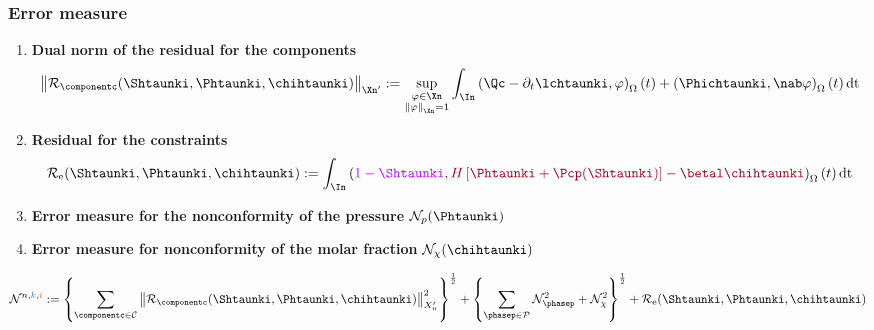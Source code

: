\begin{frame}
\frametitle{Error measure}
\vspace{-0.3 cm}
\begin{enumerate}
\item<1> 
\textcolor{cadmiumgreen}{\textbf{Dual norm of the residual for the components}}
 \begin{equation*}
\left\|\mathcal{R}_{\componentc}(\Shtaunki,\Phtaunki,\chihtaunki) \right\|_{\Xn'} \egaldef \sup_{\substack{\varphi \in \Xn \\ \left\|\varphi\right\|_{\Xn} = 1}}  \int_{\In} 
 \left(\Qc - \partial_t \lchtaunki , \varphi\right)_{\Omega}(t) + \left(\Phichtaunki,\nab \varphi \right)_{\Omega}(t)\,\mathrm{dt} 
 \end{equation*}
\pause
\item<2>
\textcolor{cadmiumgreen}{\textbf{Residual for the constraints}}
\begin{equation*}
  \mathcal{R}_{\mathrm{e}}(\Shtaunki,\Phtaunki,\chihtaunki) \egaldef \int_{\In}\left(\textcolor{electricpurple}{1 - \Shtaunki}, \textcolor{carmine}{H \left[\Phtaunki + \Pcp(\Shtaunki)\right] - \betal \chihtaunki} \right)_{\Omega}(t)\,\mathrm{dt}
\end{equation*}
\pause
\item<3>
\textcolor{cadmiumgreen}{\textbf{Error measure for the nonconformity of the pressure}} $\mathcal{N}_{p}(\Phtaunki)$
\pause
\item<4>
\textcolor{cadmiumgreen}{\textbf{Error measure for nonconformity of the molar fraction}} $\mathcal{N}_{\chi}(\chihtaunki)$
\end{enumerate}
\vspace{0.3 cm}
\begin{equation*}
\mathcal{N}^{n,\kk,\ii}  \egaldef \left\{\sum_{\componentc \in\mathcal{C}} \left\|\mathcal{R}_{\componentc}(\Shtaunki,\Phtaunki,\chihtaunki) \right\|_{X_n'}^2 \right\}^{\frac{1}{2}} + \left\{\sum_{\phasep \in \mathcal{P}}\mathcal{N}_{\phasep}^2 + \mathcal{N}_{\chi}^2\right\}^{\frac{1}{2}} + \mathcal{R}_{\mathrm{e}}(\Shtaunki,\Phtaunki,\chihtaunki)
\end{equation*}
\end{frame}
